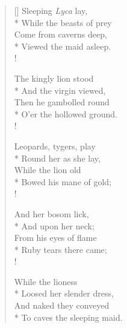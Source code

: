 \documentclass[MAIN]{subfiles}
\begin{document}
\begin{verse}[\versewidth]
Sleeping \emph{Lyca} lay,\\*
While the beasts of prey\\
Come from caverns deep,\\*
Viewed the maid asleep.\\!

The kingly lion stood\\*
And the virgin viewed,\\
Then he gambolled round\\*
O'er the hollowed ground.\\!

Leopards, tygers, play\\*
Round her as she lay,\\
While the lion old\\*
Bowed his mane of gold;\\!

And her bosom lick,\\*
And upon her neck;\\
From his eyes of flame\\*
Ruby tears there came;\\!

While the lioness\\*
Loosed her slender dress,\\
And naked they conveyed\\*
To caves the sleeping maid.
\end{verse}
\end{document}
